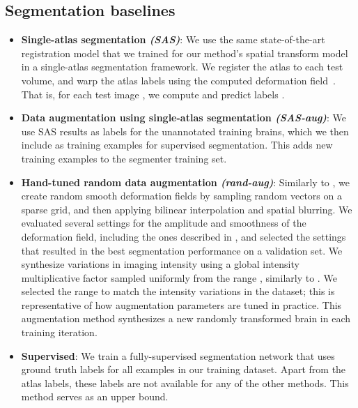 \documentclass[10pt,twocolumn,letterpaper]{article}
\begin{document}
\subsection{Segmentation baselines}\label{sec:baselines}
\begin{itemize}[leftmargin=-2pt]
\item[] \textbf{Single-atlas segmentation \textit{(SAS)}}: We use the same state-of-the-art registration model \cite{balakrishnan2018unsupervised} that we trained for our method's spatial transform model in a single-atlas segmentation framework. We register the atlas to each test volume, and warp the atlas labels using the computed deformation field~\cite{baillard2001segmentation,ciofolo2009atlas,dawant1999automatic,hellier2004hierarchical,klein2005mindboggle}. That is, for each test image , we compute  and predict labels . 

\item[] \textbf{Data augmentation using single-atlas segmentation \textit{(SAS-aug)}}: We use SAS results as labels for the unannotated training brains, which we then include as training examples for supervised segmentation. This adds  new training examples to the segmenter training set. 


\item[] \textbf{Hand-tuned random data augmentation \textit{(rand-aug)}}: Similarly to \cite{milletari2016v,ronneberger2015u,roth2015anatomy}, we create random smooth deformation fields by sampling random vectors on a sparse grid, and then applying bilinear interpolation and spatial blurring. We evaluated several settings for the amplitude and smoothness of the deformation field, including the ones described in \cite{ronneberger2015u}, and selected the settings that resulted in the best segmentation performance on a validation set. We synthesize variations in imaging intensity using a global intensity multiplicative factor sampled uniformly from the range , similarly to \cite{hussain2017differential,kamnitsas2017efficient}. We selected the range to match the intensity variations in the dataset; this is representative of how augmentation parameters are tuned in practice. This augmentation method synthesizes a new randomly transformed brain in each training iteration.

\item[] \textbf{Supervised}: We train a fully-supervised segmentation network that uses ground truth labels for all  examples in our training dataset. Apart from the atlas labels, these labels are not available for any of the other methods. This method serves as an upper bound.\\
\end{itemize}
\end{document}
